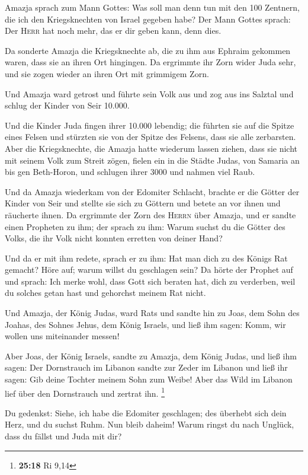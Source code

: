  Amazja sprach zum Mann Gottes: Was soll man denn tun mit
den 100 Zentnern, die ich den Kriegsknechten von Israel gegeben habe?
Der Mann Gottes sprach: Der \textsc{Herr} hat noch mehr, das er dir
geben kann, denn dies.

 Da sonderte Amazja die Kriegsknechte ab, die zu ihm aus
Ephraim gekommen waren, dass sie an ihren Ort hingingen. Da ergrimmte
ihr Zorn wider Juda sehr, und sie zogen wieder an ihren Ort mit
grimmigem Zorn.

 Und Amazja ward getrost und führte sein Volk aus und zog
aus ins Salztal und schlug der Kinder von Seir 10.000.

 Und die Kinder Juda fingen ihrer 10.000 lebendig; die
führten sie auf die Spitze eines Felsen und stürzten sie von der Spitze
des Felsens, dass sie alle zerbarsten.  Aber die
Kriegsknechte, die Amazja hatte wiederum lassen ziehen, dass sie nicht
mit seinem Volk zum Streit zögen, fielen ein in die Städte Judas, von
Samaria an bis gen Beth-Horon, und schlugen ihrer 3000 und nahmen viel
Raub.

 Und da Amazja wiederkam von der Edomiter Schlacht,
brachte er die Götter der Kinder von Seir und stellte sie sich zu
Göttern und betete an vor ihnen und räucherte ihnen.  Da
ergrimmte der Zorn des \textsc{Herrn} über Amazja, und er sandte einen
Propheten zu ihm; der sprach zu ihm: Warum suchst du die Götter des
Volks, die ihr Volk nicht konnten erretten von deiner Hand?

 Und da er mit ihm redete, sprach er zu ihm: Hat man dich
zu des Königs Rat gemacht? Höre auf; warum willst du geschlagen sein? Da
hörte der Prophet auf und sprach: Ich merke wohl, dass Gott sich beraten
hat, dich zu verderben, weil du solches getan hast und gehorchst meinem
Rat nicht.

 Und Amazja, der König Judas, ward Rats und sandte hin zu
Joas, dem Sohn des Joahas, des Sohnes Jehus, dem König Israels, und ließ
ihm sagen: Komm, wir wollen uns miteinander messen!

 Aber Joas, der König Israels, sandte zu Amazja, dem
König Judas, und ließ ihm sagen: Der Dornstrauch im Libanon sandte zur
Zeder im Libanon und ließ ihr sagen: Gib deine Tochter meinem Sohn zum
Weibe! Aber das Wild im Libanon lief über den Dornstrauch und zertrat
ihn. \footnote{\textbf{25:18} Ri 9,14}

 Du gedenkst: Siehe, ich habe die Edomiter geschlagen;
des überhebt sich dein Herz, und du suchst Ruhm. Nun bleib daheim! Warum
ringst du nach Unglück, dass du fällst und Juda mit dir?

